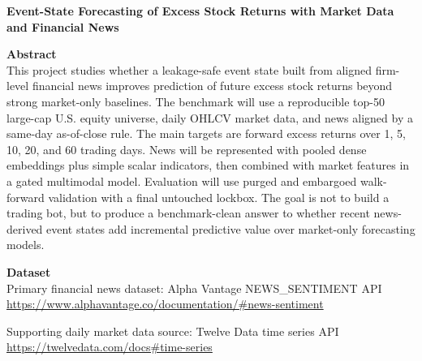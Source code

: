 \documentclass[11pt]{article}
\begin{document}
\begin{center}
{\LARGE \textbf{Event-State Forecasting of Excess Stock Returns with Market Data and Financial News}}\\[0.5em]
\end{center}

\textbf{Abstract}\\
This project studies whether a leakage-safe event state built from aligned firm-level financial news improves prediction of future excess stock returns beyond strong market-only baselines. The benchmark will use a reproducible top-50 large-cap U.S. equity universe, daily OHLCV market data, and news aligned by a same-day as-of-close rule. The main targets are forward excess returns over 1, 5, 10, 20, and 60 trading days. News will be represented with pooled dense embeddings plus simple scalar indicators, then combined with market features in a gated multimodal model. Evaluation will use purged and embargoed walk-forward validation with a final untouched lockbox. The goal is not to build a trading bot, but to produce a benchmark-clean answer to whether recent news-derived event states add incremental predictive value over market-only forecasting models.

\textbf{Dataset}\\
Primary financial news dataset: Alpha Vantage NEWS\_SENTIMENT API\\
\url{https://www.alphavantage.co/documentation/#news-sentiment}

\vspace{0.2em}
Supporting daily market data source: Twelve Data time series API\\
\url{https://twelvedata.com/docs#time-series}
\end{document}
